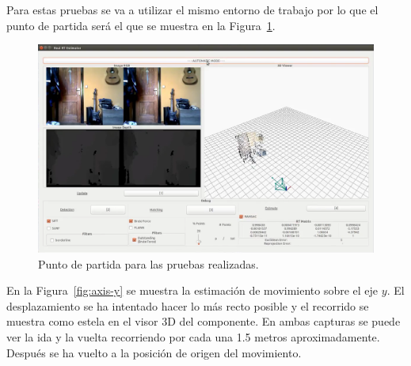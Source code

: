 Para estas pruebas se va a utilizar el mismo entorno de trabajo por lo que el punto de partida será el que se muestra en la Figura~\ref{fig:init}.

\begin{figure}[th]
\centering
\includegraphics[scale=0.3]{Figures/tests/init.png}
\decoRule
\caption[Punto de partida para las pruebas de traslación y rotación]{Punto de partida para las pruebas realizadas.}
\label{fig:init}
\end{figure}

En la Figura~\ref{fig:axis-y} se muestra la estimación de movimiento sobre el eje $y$. El desplazamiento se ha intentado hacer lo más recto posible y el recorrido se muestra como estela en el visor 3D del componente. En ambas capturas se puede ver la ida y la vuelta recorriendo por cada una 1.5 metros aproximadamente. Después se ha vuelto a la posición de origen del movimiento.

